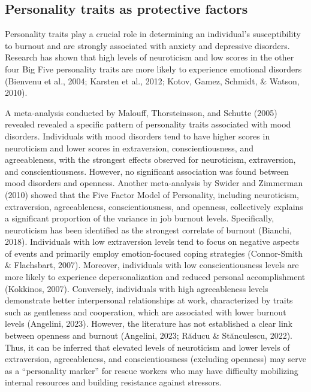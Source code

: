 \documentclass[
  man]{apa6}
\begin{document}
\hypertarget{personality-traits-as-protective-factors}{%
\subsection{Personality traits as protective factors}\label{personality-traits-as-protective-factors}}

Personality traits play a crucial role in determining an individual's susceptibility to burnout and are strongly associated with anxiety and depressive disorders. Research has shown that high levels of neuroticism and low scores in the other four Big Five personality traits are more likely to experience emotional disorders (Bienvenu et al., 2004; Karsten et al., 2012; Kotov, Gamez, Schmidt, \& Watson, 2010).

A meta-analysis conducted by Malouff, Thorsteinsson, and Schutte (2005) revealed revealed a specific pattern of personality traits associated with mood disorders. Individuals with mood disorders tend to have higher scores in neuroticism and lower scores in extraversion, conscientiousness, and agreeableness, with the strongest effects observed for neuroticism, extraversion, and conscientiousness. However, no significant association was found between mood disorders and openness. Another meta-analysis by Swider and Zimmerman (2010) showed that the Five Factor Model of Personality, including neuroticism, extraversion, agreeableness, conscientiousness, and openness, collectively explains a significant proportion of the variance in job burnout levels. Specifically, neuroticism has been identified as the strongest correlate of burnout (Bianchi, 2018). Individuals with low extraversion levels tend to focus on negative aspects of events and primarily employ emotion-focused coping strategies (Connor-Smith \& Flachsbart, 2007). Moreover, individuals with low conscientiousness levels are more likely to experience depersonalization and reduced personal accomplishment (Kokkinos, 2007). Conversely, individuals with high agreeableness levels demonstrate better interpersonal relationships at work, characterized by traits such as gentleness and cooperation, which are associated with lower burnout levels (Angelini, 2023). However, the literature has not established a clear link between openness and burnout (Angelini, 2023; Răducu \& Stănculescu, 2022). Thus, it can be inferred that elevated levels of neuroticism and lower levels of extraversion, agreeableness, and conscientiousness (excluding openness) may serve as a ``personality marker'' for rescue workers who may have difficulty mobilizing internal resources and building resistance against stressors.
\end{document}

